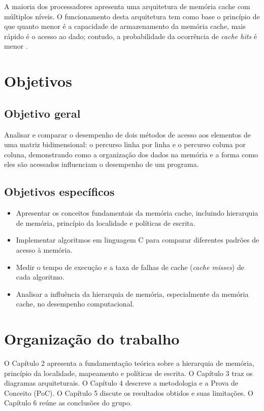 A maioria dos processadores apresenta uma arquitetura de memória cache com múltiplos níveis. O funcionamento desta arquitetura tem como base o princípio de que quanto menor é a capacidade de armazenamento da memória cache, mais rápido é o acesso ao dado; contudo, a probabilidade da ocorrência de \textit{cache hits} é menor \cite{machado2013}.

\section{Objetivos}
\subsection{Objetivo geral}
Analisar e comparar o desempenho de dois métodos de acesso aos elementos de uma matriz bidimensional: o percurso linha por linha e o percurso coluna por coluna, demonstrando como a organização dos dados na memória e a forma como eles são acessados influenciam o desempenho de um programa.

\subsection{Objetivos específicos}
\begin{itemize}
    \item Apresentar os conceitos fundamentais da memória cache, incluindo hierarquia de memória, princípio da localidade e políticas de escrita.
    \item Implementar algoritmos em linguagem C para comparar diferentes padrões de acesso à memória.
    \item Medir o tempo de execução e a taxa de falhas de cache (\textit{cache misses}) de cada algoritmo.
    \item Analisar a influência da hierarquia de memória, especialmente da memória cache, no desempenho computacional.
\end{itemize}

\section{Organização do trabalho}
O Capítulo 2 apresenta a fundamentação teórica sobre a hierarquia de memória, princípio da localidade, mapeamento e políticas de escrita. O Capítulo 3 traz os diagramas arquiteturais. O Capítulo 4 descreve a metodologia e a Prova de Conceito (PoC). O Capítulo 5 discute os resultados obtidos e suas limitações. O Capítulo 6 reúne as conclusões do grupo.